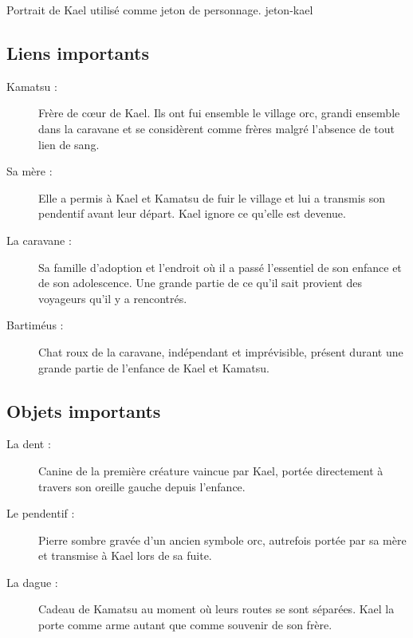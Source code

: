   {Portrait de Kael utilisé comme jeton de personnage.}
  {jeton-kael}

\subsection*{Liens importants}

\begin{description}
    \item[Kamatsu :] Frère de cœur de Kael. Ils ont fui ensemble le village
    orc, grandi ensemble dans la caravane et se considèrent comme frères malgré
    l'absence de tout lien de sang.

    \item[Sa mère :] Elle a permis à Kael et Kamatsu de fuir le village et lui
    a transmis son pendentif avant leur départ. Kael ignore ce qu'elle est
    devenue.

    \item[La caravane :] Sa famille d'adoption et l'endroit où il a passé
    l'essentiel de son enfance et de son adolescence. Une grande partie de ce
    qu'il sait provient des voyageurs qu'il y a rencontrés.

    \item[Bartiméus :] Chat roux de la caravane, indépendant et imprévisible,
    présent durant une grande partie de l'enfance de Kael et Kamatsu.
\end{description}

\subsection*{Objets importants}

\begin{description}
    \item[La dent :] Canine de la première créature vaincue par Kael, portée
    directement à travers son oreille gauche depuis l'enfance.

    \item[Le pendentif :] Pierre sombre gravée d'un ancien symbole orc,
    autrefois portée par sa mère et transmise à Kael lors de sa fuite.

    \item[La dague :] Cadeau de Kamatsu au moment où leurs routes se sont
    séparées. Kael la porte comme arme autant que comme souvenir de son frère.
\end{description}



